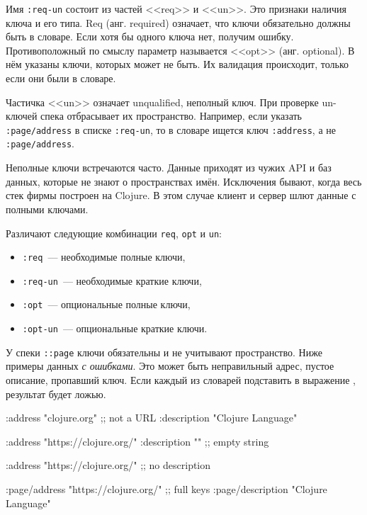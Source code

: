 Имя \verb|:req-un| состоит из частей <<req>> и <<un>>. Это признаки наличия
ключа и его типа. Req (анг. required) означает, что ключи обязательно должны
быть в словаре. Если хотя бы одного ключа нет, получим ошибку. Противоположный
по смыслу параметр называется <<opt>> (анг. optional). В нём указаны ключи,
которых может не быть. Их валидация происходит, только если они были в словаре.


Частичка <<un>> означает unqualified, неполный ключ. При проверке un-ключей
спека отбрасывает их пространство. Например, если указать \verb|:page/address|
в списке \verb|:req-un|, то в словаре ищется ключ \verb|:address|, а не
\verb|:page/address|.

Неполные ключи встречаются часто. Данные приходят из чужих API и баз данных,
которые не знают о пространствах имён. Исключения бывают, когда весь стек фирмы
построен на Clojure. В этом случае клиент и сервер шлют данные с полными
ключами.

Различают следующие комбинации \verb|req|, \verb|opt| и \verb|un|:

\begin{itemize}

\item
  \verb|:req|~--- необходимые полные ключи,

\item
  \verb|:req-un|~--- необходимые краткие ключи,


\item
  \verb|:opt|~--- опциональные полные ключи,


\item
  \verb|:opt-un|~--- опциональные краткие ключи.

\end{itemize}

У спеки \verb|::page| ключи обязательны и не учитывают пространство. Ниже
примеры данных \emph{с ошибками}. Это может быть неправильный адрес, пустое
описание, пропавший ключ. Если каждый из словарей подставить в выражение
, результат будет ложью.

\begin{english}
  \begin{clojure}
{:address "clojure.org" ;; not a URL
 :description "Clojure Language"}

{:address "https://clojure.org/"
 :description ""} ;; empty string

{:address "https://clojure.org/"} ;; no description

{:page/address "https://clojure.org/" ;; full keys
 :page/description "Clojure Language"}
  \end{clojure}
\end{english}

